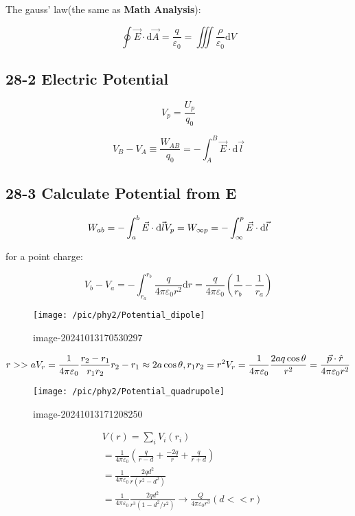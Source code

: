 \documentclass[
]{article}
\begin{document}
The gauss' law(the same as \textbf{Math Analysis}):

\[
\oint \vec E\cdot\mathrm d \vec A =\frac{q}{\varepsilon _0}=\iiint \frac{\rho}{\varepsilon_0} \mathrm d V
\]

\hypertarget{electric-potential}{%
\subsection{28-2 Electric Potential}\label{electric-potential}}

\[
V_p=\frac{U_p}{q_0}
\]

\[
V_B-V_A\equiv \frac{W_{AB}}{q_0}=-\int _{A}^B \vec E\cdot \mathrm d \vec l
\]

\hypertarget{calculate-potential-from-e}{%
\subsection{28-3 Calculate Potential from
E}\label{calculate-potential-from-e}}

\[
W_{ab}=-\int _{a}^b \vec E \cdot \mathrm d \vec l\\V_p=W_{\infty p}=-\int_{\infty}^{p} \vec E\cdot \mathrm d \vec l
\]

for a point charge:

\[
V_b-V_a=-\int _{r_a}^{r_b}\frac{q}{4\pi \varepsilon _0r^2}\mathrm dr=\frac{q}{4\pi \varepsilon _0}\left(\frac{1}{r_b}-\frac{1}{r_a}\right)
\]

\begin{figure}
\centering
\texttt{[image: /pic/phy2/Potential\_dipole]}
\caption{image-20241013170530297}
\end{figure}

\[
r>>a\\V_r=\frac{1}{4\pi \varepsilon _0}\frac{r_2-r_1}{r_1r_2}\\
r_2-r_1\approx 2a\cos \theta ,r_1r_2=r^2\\
V_r=\frac{1}{4\pi \varepsilon_0}\frac{2aq\cos \theta }{r^2}=\frac{\vec p\cdot \hat r}{4\pi \varepsilon_0 r^2}
\]

\begin{figure}
\centering
\texttt{[image: /pic/phy2/Potential\_quadrupole]}
\caption{image-20241013171208250}
\end{figure}

\[
\begin{aligned}
&V(r)=\sum_{i}V_{i}(r_{i}) \\
&=\frac{1}{4\pi\varepsilon_{0}}(\frac{q}{r-d}+\frac{-2q}{r}+\frac{q}{r+d}) \\
&=\frac{1}{4\pi\varepsilon_{0}}\frac{2qd^{2}}{r(r^{2}-d^{2})} \\
&=\frac{1}{4\pi\varepsilon_{0}}\frac{2qd^{2}}{r^{3}(1-d^{2}/r^{2})}\to \frac{Q}{4\pi \varepsilon _0r^3}(d<<r)
\end{aligned}
\]
\end{document}
